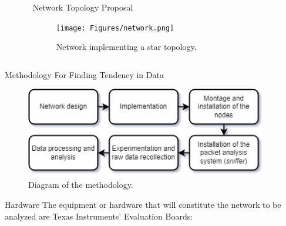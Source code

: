 \documentclass[final]{beamer}
\newlength{\sepwidthA} %
\newlength{\colwidthA} %
\newcommand{\separatorcolumnA}{\begin{column}{\sepwidthA}\end{column}}
\newlength{\sepwidthB}
\newlength{\colwidthB}
\newcommand{\separatorcolumnB}{\begin{column}{\sepwidthB}\end{column}}
\begin{document}
\begin{frame}[t]
\begin{columns}[t]
    \separatorcolumnA
    \begin{column}{\colwidthA}

        \begin{block}{Network Topology Proposal}
            \begin{figure}[!Ht]
            \centering
                \texttt{[image: Figures/network.png]}
                \caption{Network implementing a star topology.}
                \label{fig:top}
            \end{figure}
        \end{block}
    
    \end{column}

    \separatorcolumnA
\end{columns}

\begin{columns}
\separatorcolumnB

    \begin{column}[T]{\colwidthB}

        \begin{block}{Methodology For Finding Tendency in Data}

        \begin{figure}[!Ht]
            \centering
                \includegraphics[width=\linewidth]{Figures/method.png}
                \caption{Diagram of the methodology.}
                \label{fig:pipe}
        \end{figure}
    \end{block}
    
    \begin{block}{Hardware}
        The equipment or hardware that will constitute the network to be analyzed are Texas Instruments' Evaluation Boards:


\end{block}
\end{column}
\end{columns}
\end{frame}
\end{document}
